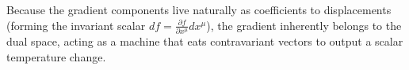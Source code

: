 \documentclass[11pt,a4paper]{article}
\begin{document}
	Because the gradient components live naturally as coefficients to displacements (forming the invariant scalar $df = \frac{\partial f}{\partial x^\mu} dx^\mu$), the gradient inherently belongs to the dual space, acting as a machine that eats contravariant vectors to output a scalar temperature change.
	
\end{document}
